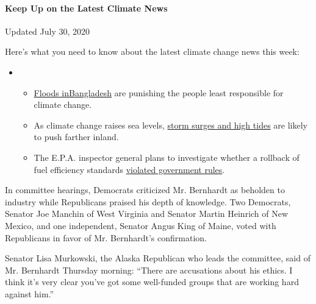 \hypertarget{keep-up-on-the-latest-climate-news}{%
\paragraph{Keep Up on the Latest Climate
News}\label{keep-up-on-the-latest-climate-news}}

Updated July 30, 2020

Here's what you need to know about the latest climate change news this
week:

\begin{itemize}
\item
  \begin{itemize}
  \tightlist
  \item
    \href{https://www.nytimes.com/2020/07/30/climate/bangladesh-floods.html?action=click\&pgtype=Article\&state=default\&region=MAIN_CONTENT_1\&context=storylines_keepup}{Floods
    in}\href{https://www.nytimes.com/2020/07/30/climate/bangladesh-floods.html?action=click\&pgtype=Article\&state=default\&region=MAIN_CONTENT_1\&context=storylines_keepup}{Bangladesh}
    are punishing the people least responsible for climate change.
  \item
    As climate change raises sea levels,
    \href{https://www.nytimes.com/2020/07/30/climate/sea-level-inland-floods.html?action=click\&pgtype=Article\&state=default\&region=MAIN_CONTENT_1\&context=storylines_keepup}{storm
    surges and high tides} are likely to push farther inland.
  \item
    The E.P.A. inspector general plans to investigate whether a rollback
    of fuel efficiency standards
    \href{https://www.nytimes.com/2020/07/27/climate/trump-fuel-efficiency-rule.html?action=click\&pgtype=Article\&state=default\&region=MAIN_CONTENT_1\&context=storylines_keepup}{violated
    government rules}.
  \end{itemize}
\end{itemize}

In committee hearings, Democrats criticized Mr. Bernhardt as beholden to
industry while Republicans praised his depth of knowledge. Two
Democrats, Senator Joe Manchin of West Virginia and Senator Martin
Heinrich of New Mexico, and one independent, Senator Angus King of
Maine, voted with Republicans in favor of Mr. Bernhardt's confirmation.

Senator Lisa Murkowski, the Alaska Republican who leads the committee,
said of Mr. Bernhardt Thursday morning: ``There are accusations about
his ethics. I think it's very clear you've got some well-funded groups
that are working hard against him.''

